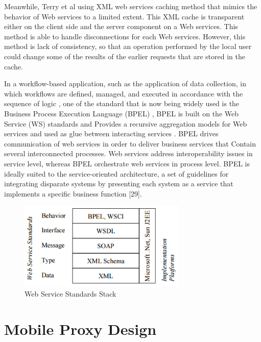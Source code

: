 \documentclass[conference]{IEEEtran}
\begin{document}
Meanwhile, Terry et al using XML web services caching method \cite{terry_caching_2003} that mimics the behavior of Web services to a limited extent. This XML cache is transparent either on the client side and the server component on a Web services. This method is able to handle disconnections for each Web services. However, this method is lack of consistency, so that an operation performed by the local user could change some of the results of the earlier requests that are stored in the cache.

In a workflow-based application, such as the application of data collection, in which workflows are defined, managed, and executed in accordance with the sequence of logic \cite{wieland_towards_2009}, one of the standard that is now being widely used is the Business Process Execution Language (BPEL) \cite{pautasso_restful_2009} \cite{weerawarana_web_2005}, BPEL is built on the Web Service (WS) standards and Provides a recursive aggregation models for Web services \cite{pasley_how_2005} and used as glue between interacting services \cite{weerawarana_web_2005}. BPEL drives communication of web services in order to deliver business services that Contain several interconnected processes. Web services address interoperability issues in service level, whereas BPEL orchestrate web services in process level. BPEL is ideally suited to the service-oriented architecture, a set of guidelines for integrating disparate systems by presenting each system as a service that implements a specific business function [29].

\begin{figure}
    \centering
    \includegraphics[width=8cm]{../../Resources/Images/ws-standards-stack}
    \caption{Web Service Standards Stack}
    \label{fig:ws-standards-stack}
\end{figure}




\section{Mobile Proxy Design}
\end{document}
